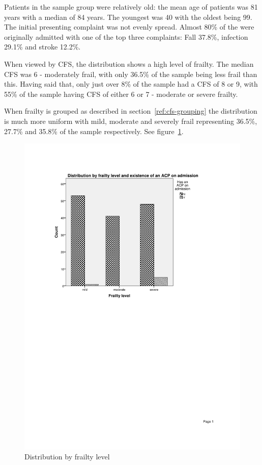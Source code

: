 \documentclass
[
	12pt,
	a4paper,
	oneside,
]{report}
\begin{document}
Patients in the sample group were relatively old: the mean age of patients was 
81 years with a median of 84 years. The youngest was 40 with the oldest being 
99. 
The initial presenting complaint was not evenly spread. Almost 80\% of the
were originally admitted with one of the top three complaints: Fall 37.8\%, 
infection 29.1\% and stroke 12.2\%. 

When viewed by CFS, the distribution shows a high level of frailty. The median 
CFS was 6 - moderately frail, with only 36.5\% of the sample being less frail
than this. Having said that, only just over 8\% of the sample had a CFS of 8
or 9, with 55\% of the sample having CFS of either 6 or 7 - moderate or
severe frailty. 

When frailty is grouped as described in section~\ref{ref:cfs-grouping} the 
distribution is much more uniform with mild, moderate and severely frail
representing 36.5\%, 27.7\% and 35.8\% of the sample respectively.
See figure~\ref{fig:chart-dist-frailty-level}.
\label{sec:results-dist}

\begin{figure}[ht]
\caption{Distribution by frailty level}
\label{fig:chart-dist-frailty-level}
\includegraphics[width=\textwidth,
	trim={2.5cm 14cm 2.5cm 2.5cm},
	clip]{media/chart-dist-frailty-level}
\end{figure}
\end{document}
